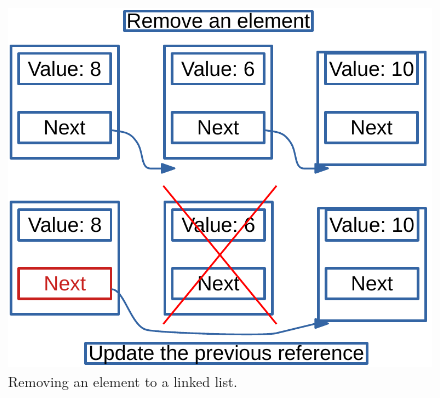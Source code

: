 \begin{figure}[H]
	\begin{center}
		\includegraphics[scale=.6]{chapters/datastructures/images/linked_list_3.pdf}
		\caption[Removing an element to a linked list.]{Removing an element to a linked list.}
		\label{linked_list_3}
	\end{center}
\end{figure}

